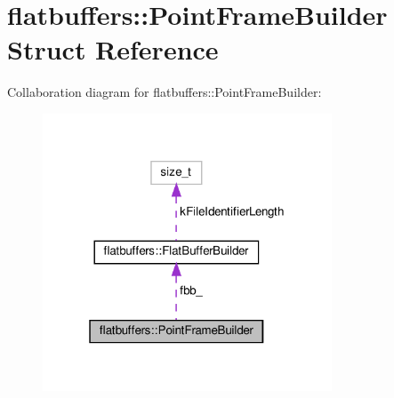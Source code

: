 \hypertarget{structflatbuffers_1_1PointFrameBuilder}{}\section{flatbuffers\+:\+:Point\+Frame\+Builder Struct Reference}
\label{structflatbuffers_1_1PointFrameBuilder}


Collaboration diagram for flatbuffers\+:\+:Point\+Frame\+Builder\+:
\nopagebreak
\begin{figure}[H]
\begin{center}
\leavevmode
\includegraphics[width=244pt]{structflatbuffers_1_1PointFrameBuilder__coll__graph}
\end{center}
\end{figure}
